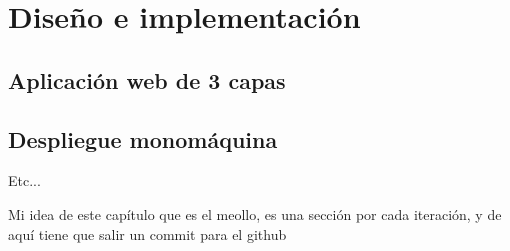 \chapter{Diseño e implementación}
\label{cha:regulation}


\section{Aplicación web de 3 capas}

\section{Despliegue monomáquina}

Etc...

Mi idea de este capítulo que es el meollo, es una sección por cada iteración,
y de aquí tiene que salir un commit para el github
